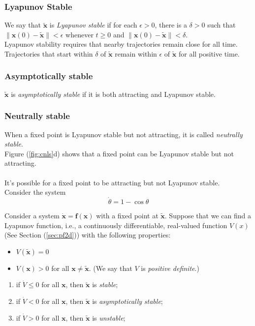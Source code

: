 \subsubsection*{Lyapunov Stable}
We say that $\mathbf{\tilde{x}}$ is \emph{Lyapunov stable} if for each $\epsilon>0$, there is a $\delta>0$ such that $\|\mathbf{x}(0)-\mathbf{\tilde{x}}\|<\epsilon$ whenever $t\geq0$ and $\|\mathbf{x}(0)-\mathbf{\tilde{x}}\|<\delta$.\\
Lyapunov stability requires that nearby trajectories remain close for
all time.\\
Trajectories that start within $\delta$ of $\mathbf{\tilde{x}}$ remain within $\epsilon$ of $\mathbf{\tilde{x}}$ for all positive time.
\subsubsection*{Asymptotically stable}
$\mathbf{\tilde{x}}$ is \emph{asymptotically stable} if it is both attracting and Lyapunov stable.
\subsubsection*{Neutrally stable}
When a fixed point is Lyapunov stable but not attracting, it is called \emph{neutrally stable}.\\
Figure (\ref{fig:cnls}d) shows that a fixed point can be Lyapunov stable but not attracting.\\\\
It’s possible for a fixed point to be attracting but not Lyapunov stable. \\
Consider the system
\begin{equation}
	\dot{\theta}=1-\cos\theta
\end{equation}
\begin{theorem}{\label{thm:lst}}
	Consider a system $\mathbf{\dot{x}}=\mathbf{f(x)}$ with a fixed point at $\mathbf{\tilde{x}}$.
	Suppose that we can find a Lyapunov function, i.e., a continuously differentiable, real-valued function $V(x)$ (See Section (\ref{sec:pf2d})) with the following properties:
	\begin{itemize}
		\item $V(\mathbf{\tilde{x}})=0$
		\item $V(\mathbf{x})>0$ for all $\mathbf{x\neq\tilde{x}}$. (We say that $V$ is \emph{positive definite}.)
	\end{itemize}
	\begin{enumerate}
	\item if $\dot{V}\leq0$ for all $\mathbf{x}$, then $\mathbf{\tilde{x}}$ is \emph{stable};
	\item if $\dot{V}<0$ for all $\mathbf{x}$, then $\mathbf{\tilde{x}}$ is \emph{asymptotically} \emph{stable};
	\item if $\dot{V}>0$ for all $\mathbf{x}$, then $\mathbf{\tilde{x}}$ is \emph{unstable};
	\end{enumerate}
\end{theorem}
